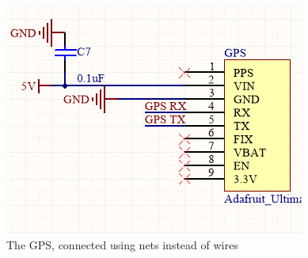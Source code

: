 \documentclass[12pt]{article}
\begin{document}
    \begin{figure}[h]
    \begin{center}
    \includegraphics[scale=.7]{Figures/Altium_gpsnets.PNG}
    \caption{The GPS, connected using nets instead of wires}
    \end{center}
    \end{figure}
    
\end{document}
